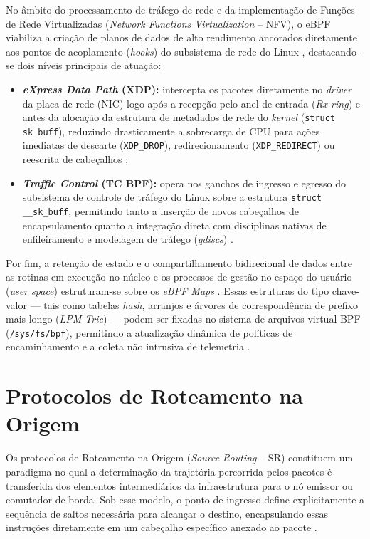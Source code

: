 No âmbito do processamento de tráfego de rede e da implementação de Funções de Rede Virtualizadas (\textit{Network Functions Virtualization} -- NFV), o eBPF viabiliza a criação de planos de dados de alto rendimento ancorados diretamente aos pontos de acoplamento (\textit{hooks}) do subsistema de rede do Linux \cite{sharaf2022extended}, destacando-se dois níveis principais de atuação:
\begin{itemize}
    \item \textbf{\textit{eXpress Data Path} (XDP):} intercepta os pacotes diretamente no \textit{driver} da placa de rede (NIC) logo após a recepção pelo anel de entrada (\textit{Rx ring}) e antes da alocação da estrutura de metadados de rede do \textit{kernel} (\texttt{struct sk\_buff}), reduzindo drasticamente a sobrecarga de CPU para ações imediatas de descarte (\texttt{XDP\_DROP}), redirecionamento (\texttt{XDP\_REDIRECT}) ou reescrita de cabeçalhos \cite{miano2018creating};
    \item \textbf{\textit{Traffic Control} (TC BPF):} opera nos ganchos de ingresso e egresso do subsistema de controle de tráfego do Linux sobre a estrutura \texttt{struct \_\_sk\_buff}, permitindo tanto a inserção de novos cabeçalhos de encapsulamento quanto a integração direta com disciplinas nativas de enfileiramento e modelagem de tráfego (\textit{qdiscs}) \cite{sharaf2022extended}.
\end{itemize}

Por fim, a retenção de estado e o compartilhamento bidirecional de dados entre as rotinas em execução no núcleo e os processos de gestão no espaço do usuário (\textit{user space}) estruturam-se sobre os \textit{eBPF Maps} \cite{sharaf2022extended}. Essas estruturas do tipo chave-valor --- tais como tabelas \textit{hash}, arranjos e árvores de correspondência de prefixo mais longo (\textit{LPM Trie}) --- podem ser fixadas no sistema de arquivos virtual BPF (\texttt{/sys/fs/bpf}), permitindo a atualização dinâmica de políticas de encaminhamento e a coleta não intrusiva de telemetria \cite{miano2018creating}.

\section{Protocolos de Roteamento na Origem}
\label{sec:roteamento_origem}

Os protocolos de Roteamento na Origem (\textit{Source Routing} -- SR) constituem um paradigma no qual a determinação da trajetória percorrida pelos pacotes é transferida dos elementos intermediários da infraestrutura para o nó emissor ou comutador de borda. Sob esse modelo, o ponto de ingresso define explicitamente a sequência de saltos necessária para alcançar o destino, encapsulando essas instruções diretamente em um cabeçalho específico anexado ao pacote \cite{dominicini2020}.

